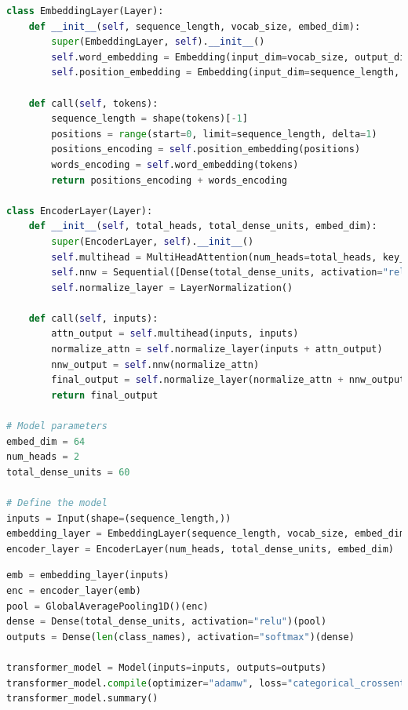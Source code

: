 \begin{tcolorbox}[colback=gray!5!white, colframe=gray!80!black, boxrule=0.5pt, title=Define Transformer Model]
    \begin{lstlisting}[language=Python]
class EmbeddingLayer(Layer):
    def __init__(self, sequence_length, vocab_size, embed_dim):
        super(EmbeddingLayer, self).__init__()
        self.word_embedding = Embedding(input_dim=vocab_size, output_dim=embed_dim)
        self.position_embedding = Embedding(input_dim=sequence_length, output_dim=embed_dim)

    def call(self, tokens):
        sequence_length = shape(tokens)[-1]
        positions = range(start=0, limit=sequence_length, delta=1)
        positions_encoding = self.position_embedding(positions)
        words_encoding = self.word_embedding(tokens)
        return positions_encoding + words_encoding

class EncoderLayer(Layer):
    def __init__(self, total_heads, total_dense_units, embed_dim):
        super(EncoderLayer, self).__init__()
        self.multihead = MultiHeadAttention(num_heads=total_heads, key_dim=embed_dim)
        self.nnw = Sequential([Dense(total_dense_units, activation="relu"), Dense(embed_dim)])
        self.normalize_layer = LayerNormalization()

    def call(self, inputs):
        attn_output = self.multihead(inputs, inputs)
        normalize_attn = self.normalize_layer(inputs + attn_output)
        nnw_output = self.nnw(normalize_attn)
        final_output = self.normalize_layer(normalize_attn + nnw_output)
        return final_output

# Model parameters
embed_dim = 64
num_heads = 2
total_dense_units = 60

# Define the model
inputs = Input(shape=(sequence_length,))
embedding_layer = EmbeddingLayer(sequence_length, vocab_size, embed_dim)
encoder_layer = EncoderLayer(num_heads, total_dense_units, embed_dim)
\end{lstlisting}
\end{tcolorbox}
\begin{tcolorbox}[colback=gray!5!white, colframe=gray!80!black, boxrule=0.5pt, title=Define Transformer Model]
    \begin{lstlisting}[language=Python]
emb = embedding_layer(inputs)
enc = encoder_layer(emb)
pool = GlobalAveragePooling1D()(enc)
dense = Dense(total_dense_units, activation="relu")(pool)
outputs = Dense(len(class_names), activation="softmax")(dense)

transformer_model = Model(inputs=inputs, outputs=outputs)
transformer_model.compile(optimizer="adamw", loss="categorical_crossentropy", metrics=['accuracy'])
transformer_model.summary()
    \end{lstlisting}
\end{tcolorbox}

